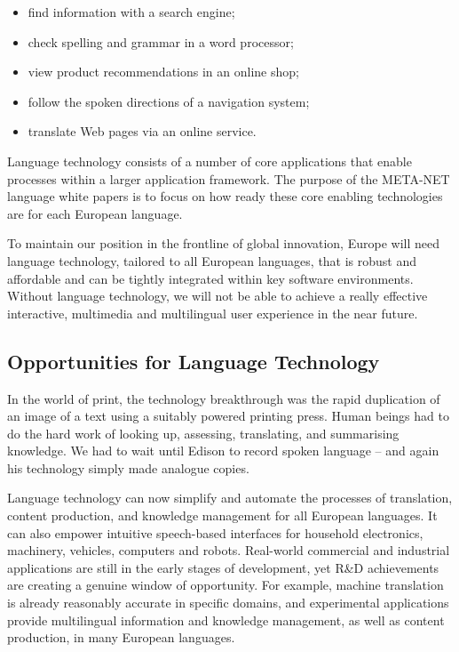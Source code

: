 \begin{multicols}{2}
\begin{itemize}
\item find information with a search engine;
\item check spelling and grammar in a word processor;
\item view product recommendations in an online shop;
\item follow the spoken directions of a navigation system;
\item translate Web pages via an online service.
\end{itemize}

Language technology consists of a number of core applications that enable processes within a larger application framework. The purpose of the META-NET language white papers is to focus on how ready these core enabling technologies are for each European language. 


To maintain our position in the frontline of global innovation, Europe will need language technology, tailored to all European languages, that is robust and affordable and can be tightly integrated within key software environments. Without language technology, we will not be able to achieve a really effective interactive, multimedia and multilingual user experience in the near future.

\subsection{Opportunities for Language Technology}

In the world of print, the technology breakthrough was the rapid duplication of an image of a text using a suitably powered printing press. Human beings had to do the hard work of looking up, assessing, translating, and summarising knowledge. We had to wait until Edison to record spoken language – and again his technology simply made analogue copies.

Language technology can now simplify and automate the processes of translation, content production, and knowledge management for all European languages. It can also empower intuitive speech-based interfaces for household electronics, machinery, vehicles, computers and robots. Real-world commercial and industrial applications are still in the early stages of development, yet R\&D achievements are creating a genuine window of opportunity. For example, machine translation is already reasonably accurate in specific domains, and experimental applications provide multilingual information and knowledge management, as well as content production, in many European languages. 


\end{multicols}
